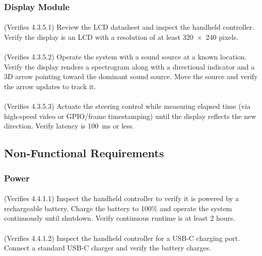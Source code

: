 \subsubsection{Display Module}

\paragraph{}
(Verifies 4.3.5.1) Review the LCD datasheet and inspect the handheld controller.  Verify the display is an LCD with a resolution of at least 320~$\times$~240 pixels.

\paragraph{}
(Verifies 4.3.5.2) Operate the system with a sound source at a known location.  Verify the display renders a spectrogram along with a directional indicator and a 3D arrow pointing toward the dominant sound source.  Move the source and verify the arrow updates to track it.

\paragraph{}
(Verifies 4.3.5.3) Actuate the steering control while measuring elapsed time (via high-speed video or GPIO/frame timestamping) until the display reflects the new direction.  Verify latency is 100~ms or less.

\subsection{Non-Functional Requirements}

\subsubsection{Power}

\paragraph{}
(Verifies 4.4.1.1) Inspect the handheld controller to verify it is powered by a rechargeable battery.  Charge the battery to 100\% and operate the system continuously until shutdown.  Verify continuous runtime is at least 2 hours.

\paragraph{}
(Verifies 4.4.1.2) Inspect the handheld controller for a USB-C charging port.  Connect a standard USB-C charger and verify the battery charges.

